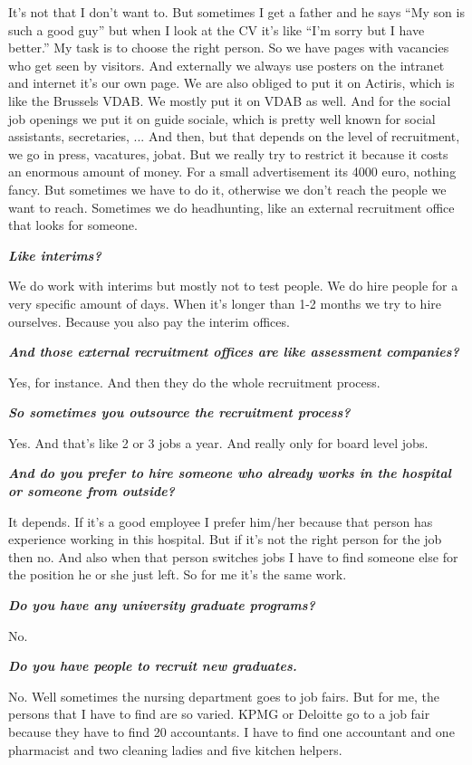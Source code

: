 \documentclass[a4paper,fleqn,11pt,dvips,titlepage]{article}
\newcommand{\question}[1]{\textbf{\textit{#1}}}
\numberwithin{figure}{section}
\numberwithin{equation}{section}
\begin{document}
It’s not that I don’t want to. But sometimes I get a father and he says “My son is such a good guy” but when I look at the CV it’s like “I’m sorry but I have better.” My task is to choose the right person. 
So we have pages with vacancies who get seen by visitors. And externally we always use posters on the intranet and internet it’s our own page. We are also obliged to put it on Actiris, which is like the Brussels VDAB. We mostly put it on VDAB as well. And for the social job openings we put it on guide sociale, which is pretty well known for social assistants, secretaries, ... And then, but that depends on the level of recruitment, we go in press, vacatures, jobat. But we really try to restrict it because it costs an enormous amount of money. For a small advertisement its 4000 euro, nothing fancy. But sometimes we have to do it, otherwise we don’t reach the people we want to reach. Sometimes we do headhunting, like an external recruitment office that looks for someone. 

\question{Like interims?}

We do work with interims but mostly not to test people. We do hire people for a very specific amount of days. When it’s longer than 1-2 months we try to hire ourselves. Because you also pay the interim offices. 

\question{And those external recruitment offices are like assessment companies?}

Yes, for instance. And then they do the whole recruitment process. 

\question{So sometimes you outsource the recruitment process?}

Yes. And that’s like 2 or 3 jobs a year. And really only for board level jobs. 

\question{And do you prefer to hire someone who already works in the hospital or someone from outside?}

It depends. If it’s a good employee I prefer him/her because that person has experience working in this hospital. But if it’s not the right person for the job then no. And also when that person switches jobs I have to find someone else for the position he or she just left. So for me it’s the same work. 

\question{Do you have any university graduate programs? }

No. 


\question{Do you have people to recruit new graduates.}

No. Well sometimes the nursing department goes to job fairs. But for me, the persons that I have to find are so varied. KPMG or Deloitte go to a job fair because they have to find 20 accountants. I have to find one accountant and one pharmacist and two cleaning ladies and five kitchen helpers. 
\end{document}
